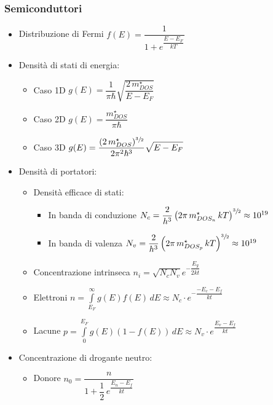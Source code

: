\documentclass{article}
\begin{document}
\subsubsection{Semiconduttori}
\begin{itemize}
  \item Distribuzione di Fermi \( f(E) = \dfrac{1}{1+e^{\dfrac{E-E_F}{kT}}} \)
  \item Densità di stati di energia:
        \begin{itemize}
          \item Caso 1D \( \displaystyle g(E) = \dfrac{1}{\pi \hbar} \sqrt{\dfrac{2 \, m_{DOS}^\star}{E-E_F}} \)
          \item Caso 2D \( g(E) = \dfrac{m_{DOS}^\star}{\pi \hbar} \)
          \item Caso 3D \( \displaystyle g(E) = \dfrac{(2 \, m_{DOS}^\star) ^ {\sfrac{3}{2}}}{2 \pi^2 \hbar^3} \sqrt{E-E_F} \)
        \end{itemize}
  \item Densità di portatori:
        \begin{itemize}
          \item Densità efficace di stati:
                \begin{itemize}
                  \item In banda di conduzione \( N_c = \dfrac{2}{h ^ 3} \left(2 \pi \, m^{\star}_{DOS_n} \, k T \right) ^ {\sfrac{3}{2}} \approx 10 ^ {19} \)
                  \item In banda di valenza \( N_v = \dfrac{2}{h ^ 3} \left(2 \pi \, m^{\star}_{DOS_p} \, k T \right) ^ {\sfrac{3}{2}} \approx 10 ^ {19} \)
                \end{itemize}
          \item Concentrazione intrinseca \( \displaystyle n_i = \sqrt{N_c  N_v} e ^ {-\dfrac{E_{g}}{2kt}} \)
          \item Elettroni \( \displaystyle n = \int\limits_{E_F}^{\infty} g(E) f(E) \, dE \approx N_c \cdot e ^ {-\dfrac{-E_c - E_f}{kt}} \)
          \item Lacune \( \displaystyle p = \int\limits_{0}^{E_F} g(E) \left( 1- f(E) \right) \, dE \approx N_v \cdot e ^ {\dfrac{E_v - E_f}{kt}} \)
        \end{itemize}
  \item Concentrazione di drogante neutro:
        \begin{itemize}
          \item Donore \( n_0 = \dfrac{n}{1 + \dfrac{1}{2} \, e^{\dfrac{E_n-E_f}{kt}}} \)

\end{itemize}
\end{itemize}
\end{document}
